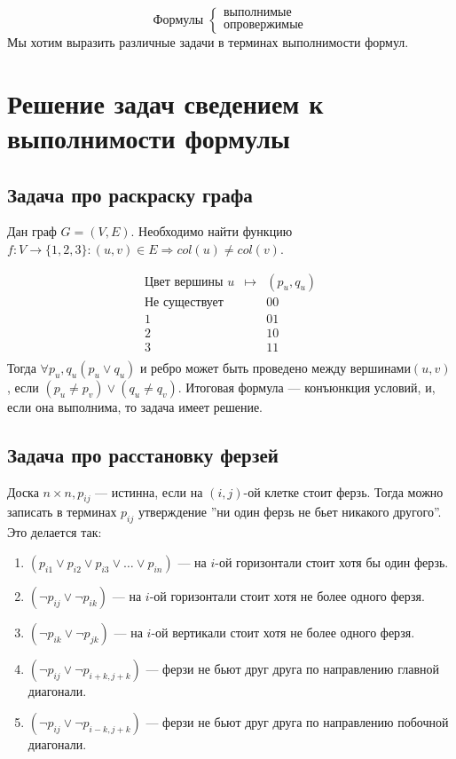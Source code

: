 
$$\text{Формулы }\left\{\begin{array}{l}
    \text{выполнимые}  \\
    \text{опровержимые}
\end{array}\right.$$
Мы хотим выразить различные задачи в терминах выполнимости формул.

\section{Решение задач сведением к выполнимости формулы}
\subsection{Задача про раскраску графа}
Дан граф $G = (V, E)$. Необходимо найти функцию $f: V \rightarrow \{1, 2, 3\}: (u, v) \in E \Rightarrow col(u) \ne col(v)$.

$$\begin{array}{ccc}
    \text{Цвет вершины $u$} & \mapsto & (p_u, q_u) \\
    \hline
    \text{Не существует} & & 00 \\
    1 & & 01 \\
    2 & & 10 \\
    3 & & 11 \\
\end{array}$$
Тогда $\forall p_u, q_u (p_u \vee q_u)$ и ребро может быть проведено между вершинами$(u, v)$, если $(p_u \ne p_v) \vee (q_u \ne q_v)$. Итоговая формула --- конъюнкция условий, и, если она выполнима, то задача имеет решение.

\subsection{Задача про расстановку ферзей}
Доска $n\times n, p_{ij}$ --- истинна, если на $(i, j)$-ой клетке стоит ферзь. Тогда можно записать в терминах $p_{ij}$ утверждение ''ни один ферзь не бьет никакого другого''. Это делается так:
\begin{enumerate}
    \item $(p_{i1} \vee p_{i2} \vee p_{i3} \vee \dots \vee p_{in})$ --- на $i$-ой горизонтали стоит хотя бы один ферзь.
    \item $(\neg p_{ij} \vee \neg p_{ik})$ --- на $i$-ой горизонтали стоит хотя не более одного ферзя.
    \item $(\neg p_{ik} \vee \neg p_{jk})$ --- на $i$-ой вертикали стоит хотя не более одного ферзя.
    \item $(\neg p_{ij} \vee \neg p_{i+k, j+k})$ --- ферзи не бьют друг друга по направлению главной диагонали.
    \item $(\neg p_{ij} \vee \neg p_{i-k, j+k})$ --- ферзи не бьют друг друга по направлению побочной диагонали.
\end{enumerate}

